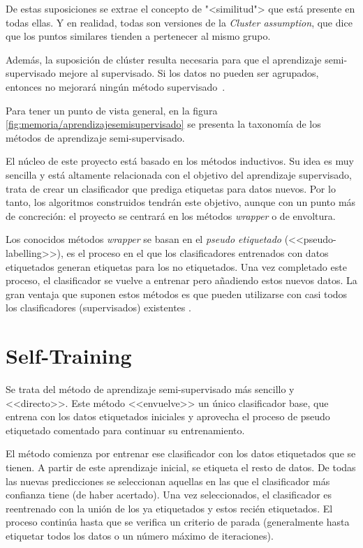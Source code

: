 De estas suposiciones se extrae el concepto de "<similitud"> que está presente
en todas ellas. Y en realidad, todas son versiones de la \textit{Cluster
assumption}, que dice que los puntos similares tienden a pertenecer al mismo
grupo. 

Además, la suposición de clúster resulta necesaria para que el aprendizaje
semi-supervisado mejore al supervisado. Si los datos no pueden ser agrupados,
entonces no mejorará ningún método supervisado~\cite{vanEngelen2020}.


Para tener un punto de vista general, en la figura \ref{fig:memoria/aprendizajesemisupervisado} se presenta la
taxonomía de los métodos de aprendizaje semi-supervisado.


El núcleo de este proyecto está basado en los métodos inductivos. Su idea es muy
sencilla y está altamente relacionada con el objetivo del aprendizaje
supervisado, trata de crear un clasificador que prediga etiquetas para datos
nuevos. Por lo tanto, los algoritmos construidos tendrán este objetivo, aunque
con un punto más de concreción: el proyecto se centrará en los métodos
\emph{wrapper} o de envoltura.

Los conocidos métodos \emph{wrapper} se basan en el \textit{pseudo etiquetado}
(<<pseudo-labelling>>), es el proceso en el que los clasificadores entrenados
con datos etiquetados generan etiquetas para los no etiquetados. Una vez
completado este proceso, el clasificador se vuelve a entrenar pero añadiendo
estos nuevos datos. La gran ventaja que suponen estos métodos es que pueden
utilizarse con casi todos los clasificadores (supervisados) existentes
\cite{vanEngelen2020}.

\section{Self-Training}
Se trata del método de aprendizaje semi-supervisado más sencillo y <<directo>>.
Este método <<envuelve>> un único clasificador base, que entrena con los datos
etiquetados iniciales y aprovecha el proceso de pseudo etiquetado comentado para
continuar su entrenamiento.

El método comienza por entrenar ese clasificador con los datos etiquetados que
se tienen. A partir de este aprendizaje inicial, se etiqueta el resto de datos.
De todas las nuevas predicciones se seleccionan aquellas en las que el
clasificador más confianza tiene (de haber acertado). Una vez seleccionados, el
clasificador es reentrenado con la unión de los ya etiquetados y estos recién
etiquetados. El proceso continúa hasta que se verifica un criterio de parada
(generalmente hasta etiquetar todos los datos o un número máximo de
iteraciones).

